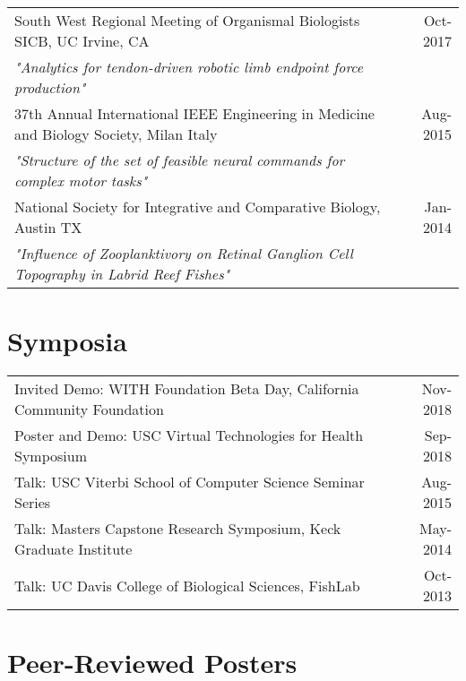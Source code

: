 \documentclass[10pt,a4paper]{article}
\begin{document}
  \vspace*{1mm}\noindent\begin{tabularx}{17cm}{X r}
	  South West Regional Meeting of Organismal Biologists SICB, UC Irvine, CA & Oct-2017 \\ %
    \textit{"Analytics for tendon-driven robotic limb endpoint force production"}\\[2mm]
    37th Annual International IEEE Engineering in Medicine and Biology Society, Milan Italy & Aug-2015 \\  %
    \textit{"Structure of the set of feasible neural commands for complex motor tasks"}\\[2mm]
    National Society for Integrative and Comparative Biology, Austin TX & Jan-2014 \\  %
    \textit{"Influence of Zooplanktivory on Retinal Ganglion Cell Topography in Labrid Reef Fishes"}\\[2mm]
  \end{tabularx}

  \vspace*{2mm}\section*{Symposia}

  \vspace*{1mm}\noindent\begin{tabularx}{17cm}{X r}
    Invited Demo: WITH Foundation Beta Day, California Community Foundation & Nov-2018\\
    Poster and Demo: USC Virtual Technologies for Health Symposium & Sep-2018 \\
    Talk: USC Viterbi School of Computer Science Seminar Series & Aug-2015 \\
    Talk: Masters Capstone Research Symposium, Keck Graduate Institute & May-2014 \\
    Talk: UC Davis College of Biological Sciences, FishLab & Oct-2013 \\
  \end{tabularx}


    \vspace*{2mm}\section*{Peer-Reviewed Posters}
\end{document}
